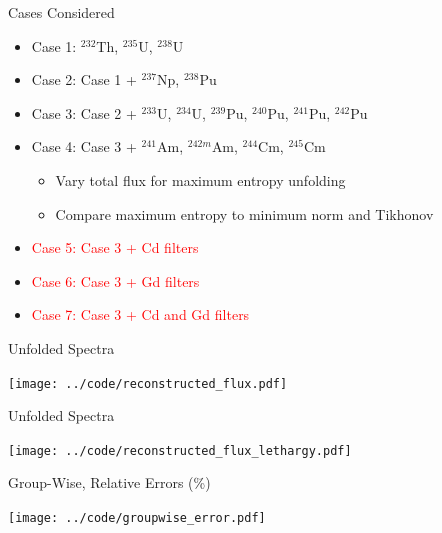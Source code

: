 \documentclass[fleqn]{beamer}
\begin{document}
    
    
    \begin{frame}{Cases Considered}
      \begin{itemize}
      \item Case 1: ${}^{232}$Th, ${}^{235}$U, ${}^{238}$U
      \item Case 2: Case 1 + ${}^{237}$Np,  ${}^{238}$Pu
      \item Case 3: Case 2 + ${}^{233}$U, ${}^{234}$U, 
                    ${}^{239}$Pu, ${}^{240}$Pu, ${}^{241}$Pu, ${}^{242}$Pu
      \item Case 4: Case 3 +
                    ${}^{241}$Am, ${}^{242m}$Am,
                    ${}^{244}$Cm, ${}^{245}$Cm 
        \begin{itemize}
          \item Vary total flux for maximum entropy unfolding
          \item Compare maximum entropy to minimum norm and Tikhonov
        \end{itemize}
      \pause
      \item \textcolor{red}{Case 5: Case 3 + Cd filters}
      \item \textcolor{red}{Case 6: Case 3 + Gd filters}
      \item \textcolor{red}{Case 7: Case 3 + Cd and Gd filters}
      \end{itemize}
    \end{frame}
    
    \begin{frame}{Unfolded Spectra}
         \begin{center}
             \texttt{[image: ../code/reconstructed\_flux.pdf]}
         \end{center}
    \end{frame}

    \begin{frame}{Unfolded Spectra}
         \begin{center}
             \texttt{[image: ../code/reconstructed\_flux\_lethargy.pdf]}
         \end{center}
    \end{frame}
    
    \begin{frame}{Group-Wise, Relative Errors (\%)}
         \begin{center}
             \texttt{[image: ../code/groupwise\_error.pdf]}
         \end{center}
    \end{frame}
    
\end{document}
